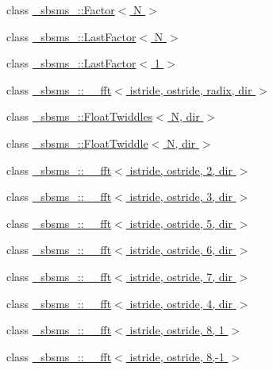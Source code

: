 \begin{DoxyCompactItemize}
\item 
class \hyperlink{class__sbsms___1_1_factor}{\+\_\+sbsms\+\_\+\+::\+Factor$<$ N $>$}
\item 
class \hyperlink{class__sbsms___1_1_last_factor}{\+\_\+sbsms\+\_\+\+::\+Last\+Factor$<$ N $>$}
\item 
class \hyperlink{class__sbsms___1_1_last_factor_3_011_01_4}{\+\_\+sbsms\+\_\+\+::\+Last\+Factor$<$ 1 $>$}
\item 
class \hyperlink{class__sbsms___1_1____fft}{\+\_\+sbsms\+\_\+\+::\+\_\+\+\_\+fft$<$ istride, ostride, radix, dir $>$}
\item 
class \hyperlink{class__sbsms___1_1_float_twiddles}{\+\_\+sbsms\+\_\+\+::\+Float\+Twiddles$<$ N, dir $>$}
\item 
class \hyperlink{class__sbsms___1_1_float_twiddle}{\+\_\+sbsms\+\_\+\+::\+Float\+Twiddle$<$ N, dir $>$}
\item 
class \hyperlink{class__sbsms___1_1____fft_3_01istride_00_01ostride_00_012_00_01dir_01_4}{\+\_\+sbsms\+\_\+\+::\+\_\+\+\_\+fft$<$ istride, ostride, 2, dir $>$}
\item 
class \hyperlink{class__sbsms___1_1____fft_3_01istride_00_01ostride_00_013_00_01dir_01_4}{\+\_\+sbsms\+\_\+\+::\+\_\+\+\_\+fft$<$ istride, ostride, 3, dir $>$}
\item 
class \hyperlink{class__sbsms___1_1____fft_3_01istride_00_01ostride_00_015_00_01dir_01_4}{\+\_\+sbsms\+\_\+\+::\+\_\+\+\_\+fft$<$ istride, ostride, 5, dir $>$}
\item 
class \hyperlink{class__sbsms___1_1____fft_3_01istride_00_01ostride_00_016_00_01dir_01_4}{\+\_\+sbsms\+\_\+\+::\+\_\+\+\_\+fft$<$ istride, ostride, 6, dir $>$}
\item 
class \hyperlink{class__sbsms___1_1____fft_3_01istride_00_01ostride_00_017_00_01dir_01_4}{\+\_\+sbsms\+\_\+\+::\+\_\+\+\_\+fft$<$ istride, ostride, 7, dir $>$}
\item 
class \hyperlink{class__sbsms___1_1____fft_3_01istride_00_01ostride_00_014_00_01dir_01_4}{\+\_\+sbsms\+\_\+\+::\+\_\+\+\_\+fft$<$ istride, ostride, 4, dir $>$}
\item 
class \hyperlink{class__sbsms___1_1____fft_3_01istride_00_01ostride_00_018_00_011_01_4}{\+\_\+sbsms\+\_\+\+::\+\_\+\+\_\+fft$<$ istride, ostride, 8, 1 $>$}
\item 
class \hyperlink{class__sbsms___1_1____fft_3_01istride_00_01ostride_00_018_00-1_01_4}{\+\_\+sbsms\+\_\+\+::\+\_\+\+\_\+fft$<$ istride, ostride, 8,-\/1 $>$}

\end{DoxyCompactItemize}
